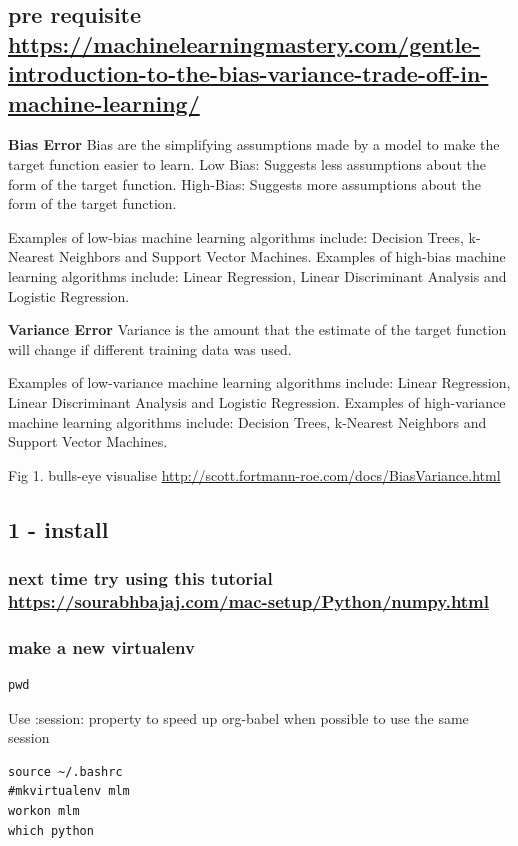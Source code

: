 \documentclass[11pt]{article}
\begin{document}
\subsection{pre requisite \url{https://machinelearningmastery.com/gentle-introduction-to-the-bias-variance-trade-off-in-machine-learning/}}
\label{sec:org021b4c9}
\textbf{Bias Error}
Bias are the simplifying assumptions made by a model to make the target function easier to learn.
Low Bias: Suggests less assumptions about the form of the target function.
High-Bias: Suggests more assumptions about the form of the target function.

Examples of low-bias machine learning algorithms include: Decision Trees, k-Nearest Neighbors and Support Vector Machines.
Examples of high-bias machine learning algorithms include: Linear Regression, Linear Discriminant Analysis and Logistic Regression.

\textbf{Variance Error}
Variance is the amount that the estimate of the target function will change if different training data was used.

Examples of low-variance machine learning algorithms include: Linear Regression, Linear Discriminant Analysis and Logistic Regression.
Examples of high-variance machine learning algorithms include: Decision Trees, k-Nearest Neighbors and Support Vector Machines.

Fig 1. bulls-eye visualise \url{http://scott.fortmann-roe.com/docs/BiasVariance.html}

\subsection{1 - install}
\label{sec:org0dbafa5}
\subsubsection{next time try using this tutorial \url{https://sourabhbajaj.com/mac-setup/Python/numpy.html}}
\label{sec:org43304ab}
\subsubsection{make a new virtualenv}
\label{sec:orgb04bc27}
\begin{verbatim}
pwd
\end{verbatim}


Use :session: property to speed up org-babel when possible to use the same session
\begin{verbatim}
source ~/.bashrc
#mkvirtualenv mlm
workon mlm
which python
\end{verbatim}
\end{document}
